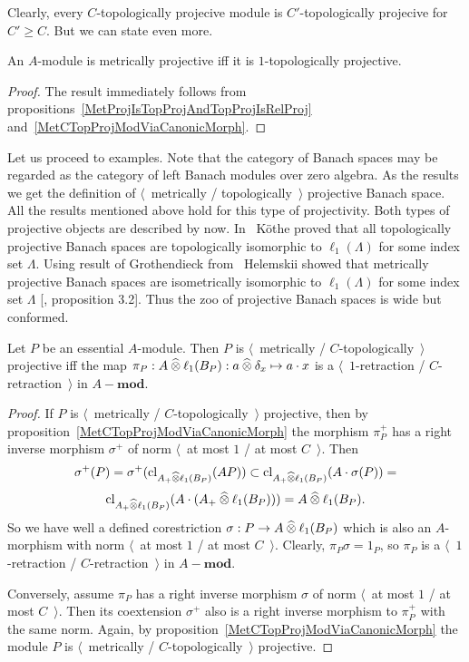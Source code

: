 Clearly, every $C$-topologically projecive module is $C'$-topologically 
projecive for $C'\geq C$. But we can state even more.

\begin{proposition}\label{MetProjIsOneTopProj} An $A$-module is metrically
projective iff it is $1$-topologically projective.
\end{proposition}
\begin{proof} The result immediately follows 
from propositions~\ref{MetProjIsTopProjAndTopProjIsRelProj} 
and~\ref{MetCTopProjModViaCanonicMorph}.
\end{proof}


Let us proceed to examples. Note that the category of Banach spaces may be
regarded as the category of left Banach modules over zero algebra. As the
results we get the definition of $\langle$~metrically / topologically~$\rangle$
projective Banach space. All the results mentioned above hold for this type of
projectivity. Both types of projective objects are described by now.
In~\cite{KotheTopProjBanSp} K{\"o}the proved that all topologically projective
Banach spaces are topologically isomorphic to $\ell_1(\Lambda)$ for some index
set $\Lambda$. Using result of Grothendieck from~\cite{GrothMetrProjFlatBanSp}
Helemskii showed that metrically projective Banach spaces are isometrically
isomorphic to $\ell_1(\Lambda)$ for some index set $\Lambda$
[\cite{HelMetrFrQMod}, proposition 3.2]. Thus the zoo of projective Banach
spaces is wide but conformed.

\begin{proposition}\label{NonDegenMetTopProjCharac}  Let $P$ be an essential
$A$-module. Then $P$ is $\langle$~metrically / $C$-topologically~$\rangle$
projective iff the map 
$\pi_P:A\mathbin{\widehat{\otimes}}\ell_1(B_P):a\mathbin{\widehat{\otimes}}\delta_x\mapsto a\cdot x$ 
is a $\langle$~$1$-retraction / $C$-retraction~$\rangle$ in $A-\mathbf{mod}$.
\end{proposition} 
\begin{proof}
If $P$ is $\langle$~metrically / $C$-topologically~$\rangle$ projective, then by
proposition~\ref{MetCTopProjModViaCanonicMorph} the morphism 
$\pi_P^+$ has a right inverse morphism $\sigma^+$ of norm 
$\langle$~at most $1$ / at most $C$~$\rangle$. Then 
$$
\sigma^+(P)
=\sigma^+(\operatorname{cl}_{A_+\mathbin{\widehat{\otimes}}\ell_1(B_P)}(AP))
\subset \operatorname{cl}_{A_+\mathbin{\widehat{\otimes}}\ell_1(B_P)}(A\cdot\sigma(P))=
$$
$$
\operatorname{cl}_{A_+\mathbin{\widehat{\otimes}}\ell_1(B_P)}(A\cdot(A_+\mathbin{\widehat{\otimes}}\ell_1(B_P)))
=A\mathbin{\widehat{\otimes}}\ell_1(B_P).
$$ 
So we have well a defined corestriction $\sigma:P\to A\mathbin{\widehat{\otimes}}\ell_1(B_P)$
which is also an $A$-morphism with norm $\langle$~at most $1$ / at most
$C$~$\rangle$. Clearly, $\pi_P\sigma=1_P$, so $\pi_P$ is a
$\langle$~$1$-retraction / $C$-retraction~$\rangle$ in $A-\mathbf{mod}$.

Conversely, assume $\pi_P$ has a right inverse morphism $\sigma$ of norm
$\langle$~at most $1$ / at most $C$~$\rangle$. Then its coextension $\sigma^+$
also is a right inverse morphism to $\pi_P^+$ with the same norm. Again, by
proposition~\ref{MetCTopProjModViaCanonicMorph} the module $P$ is
$\langle$~metrically / $C$-topologically~$\rangle$ projective. 
\end{proof}

